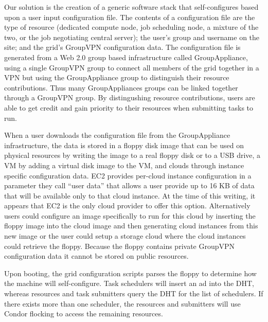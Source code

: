 \documentclass{sig-alternate}
\begin{document}
Our solution is the creation of a generic software stack that self-configures
based upon a user input configuration file.  The contents of a configuration
file are the type of resource (dedicated compute node, job scheduling node, a
mixture of the two, or the job negotiating central server); the user's group and
username on the site; and the grid's GroupVPN configuration data.  The
configuration file is generated from a Web 2.0 group based infrastructure
called GroupAppliance, using a single GroupVPN group to connect all members of
the grid together in a VPN but using the GroupAppliance group to distinguish
their resource contributions.  Thus many GroupAppliances groups can be linked
together through a GroupVPN group.  By distingushing resource contributions,
users are able to get credit and gain priority to their resources when
submitting tasks to run.

When a user downloads the configuration file from the GroupAppliance
infrastructure, the data is stored in a floppy disk image that can be used on
physical resources by writing the image to a real floppy disk or to a USB drive,
a VM by adding a virtual disk image to the VM, and clouds through instance
specific configuration data.  EC2 provides per-cloud instance configuration in a
parameter they call ``user data'' that allows a user provide up to 16 KB of data
that will be available only to that cloud instance.  At the time of this
writing, it appears that EC2 is the only cloud provider to offer this option.
Alternatively users could configure an image specifically to run for this
cloud by inserting the floppy image into the cloud image and then generating
cloud instances from this new image or the user could setup a storage cloud
where the cloud instances could retrieve the floppy.  Because the floppy
contains private GroupVPN configuration data it cannot be stored on public
resources.

Upon booting, the grid configuration scripts parses the floppy to determine how
the machine will self-configure.  Task schedulers will insert an ad into the
DHT, whereas resources and task submitters query the DHT for the list of
schedulers.  If there exists more than one scheduler, the resources and
submitters will use Condor flocking to access the remaining resources.
\end{document}
